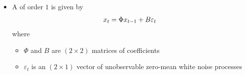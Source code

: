 \documentclass[10pt,english,t,aspectratio=169,ignorenonframetext]{beamer}
\begin{document}
\begin{frame}
\begin{itemize}
\item A {} of order $1$ is given by%
\begin{equation*}
x_{t}=\Phi x_{t-1}+B\varepsilon _{t}\vspace{-0.3cm}
\end{equation*}%
where\smallskip

\begin{itemize}
\item $\Phi $ and $B$ are $(2\times 2)$ matrices of coefficients\medskip

\item $\varepsilon _{t}$ is an $(2\times 1)$ vector of unobservable
zero-mean white noise processes
\end{itemize}
\end{itemize}

\end{frame}

\end{document}
